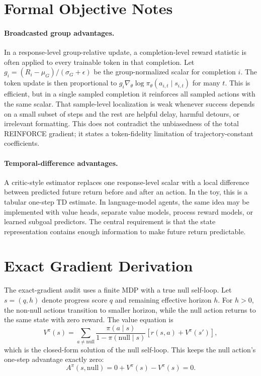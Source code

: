 \documentclass[11pt]{article}
\begin{document}
\appendix

\section{Formal Objective Notes}

\paragraph{Broadcasted group advantages.}
In a response-level group-relative update, a completion-level reward statistic
is often applied to every trainable token in that completion. Let
$g_i=(R_i-\mu_G)/(\sigma_G+\epsilon)$ be the group-normalized scalar for
completion $i$. The token update is then proportional to
$g_i\nabla_\theta\log\pi_\theta(a_{i,t}\mid s_{i,t})$ for many $t$. This is
efficient, but in a single sampled completion it reinforces all sampled actions
with the same scalar. That sample-level localization is weak whenever success
depends on a small subset of steps and the rest are helpful delay, harmful
detours, or irrelevant formatting. This does not contradict the unbiasedness of
the total REINFORCE gradient; it states a token-fidelity limitation of
trajectory-constant coefficients.

\paragraph{Temporal-difference advantages.}
A critic-style estimator replaces one response-level scalar with a local
difference between predicted future return before and after an action. In the
toy, this is a tabular one-step TD estimate. In language-model agents, the same
idea may be implemented with value heads, separate value models, process reward
models, or learned subgoal predictors. The central requirement is that the
state representation contains enough information to make future return
predictable.

\section{Exact Gradient Derivation}

The exact-gradient audit uses a finite MDP with a true null self-loop. Let
$s=(q,h)$ denote progress score $q$ and remaining effective horizon $h$. For
$h>0$, the non-null actions transition to smaller horizon, while the null
action returns to the same state with zero reward. The value equation is
\begin{equation}
V^\pi(s)=
\sum_{a\neq \mathrm{null}}
\frac{\pi(a\mid s)}{1-\pi(\mathrm{null}\mid s)}
\left[r(s,a)+V^\pi(s')\right],
\end{equation}
which is the closed-form solution of the null self-loop. This keeps the null
action's one-step advantage exactly zero:
\begin{equation}
A^\pi(s,\mathrm{null})
=0+V^\pi(s)-V^\pi(s)=0.
\end{equation}
\end{document}
